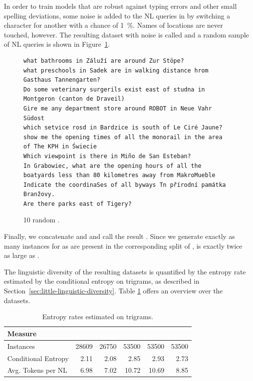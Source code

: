 In order to train models that are robust against typing errors and other small
spelling deviations, some noise is added to the NL queries in
\nlmapsthreea{} by switching a character for another with a chance of
\SI{1}{\%}. Names of locations are never touched, however. The resulting dataset
with noise is called \nlmapsthreeb{} and a random sample of NL queries is
shown in Figure~\ref{fig:nlmaps-v3b-sample}.

\begin{figure}[h]
  \centering
\begin{lstlisting}[style=MyNL]
what bathrooms in Záluží are around Zur Stöpe?
what preschools in Sadek are in walking distance hrom Gasthaus Tannengarten?
Do some veterinary surgerils exist east of studna in Montgeron (canton de Draveil)
Gire me any department store around ROBOT in Neue Vahr Südost
which setvice rosd in Bardzice is south of Le Ciré Jaune?
show me the opening times of all the monorail in the area of The KPH in Świecie
Which viewpoint is there in Miño de San Esteban?
In Grabowiec, what are the opening hours of all the boatyards less than 80 kilometres away from MakroMueble
Indicate the coordinaSes of all byways Tn přírodní památka Branžovy.
Are there parks east of Tigery?
\end{lstlisting}
  \caption[10 random \nlmapsthreeb{}.]{10 random \nlmapsthreeb{}.}
  \label{fig:nlmaps-v3b-sample}
\end{figure}

Finally, we concatenate \nlmapstwo{} and \nlmapsthreeb{} and call the result
\nlmapsthree{}. Since we generate exactly as many instances for
\nlmapsthreeb{} as are present in the corresponding split of \nlmapstwoone{},
\nlmapsthree{} is exactly twice as large as \nlmapstwoone{}.

The linguistic diversity of the resulting datasets is quantified by the entropy
rate estimated by the conditional entropy on trigrams, as described in
Section~\ref{sec:little-linguistic-diversity}. Table \ref{tab:v2-v3-overview}
offers an overview over the datasets.

\begin{table}[h]
  \centering
  \begin{tabular}{lrrrrr}
    \toprule
    Measure & \nlmtwo{} & \nlmtwoone{} & \nlmthreea{} & \nlmthreeb{} & \nlmthree{}\\
    \midrule
    Instances & \num{28609} & \num{26750} & \num{53500} & \num{53500} & \num{53500}\\
    Conditional Entropy & \num{2.11} & \num{2.08} & \num{2.85} & \num{2.93} & \num{2.73}\\
    Avg. Tokens per NL & \num{6.98} & \num{7.02} & \num{10.72} & \num{10.69} & \num{8.85}\\
    \bottomrule
  \end{tabular}
  \caption{Entropy rates estimated on trigrams.}
  \label{tab:v2-v3-overview}
\end{table}

